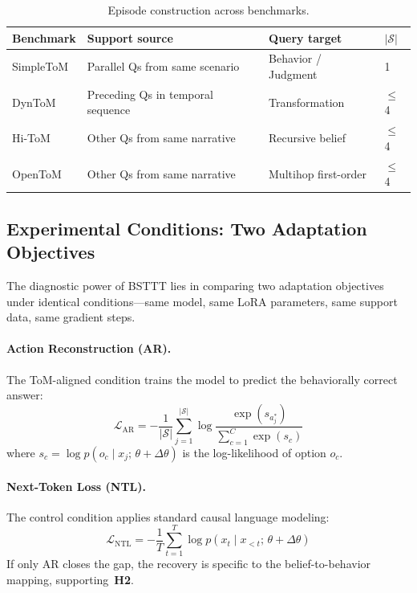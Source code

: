 \documentclass{article}
\begin{document}
\begin{table}[t]
    \caption{Episode construction across benchmarks.}
    \label{tab:episode_construction}
    \centering
    \small
    \begin{tabular}{@{}llll@{}}
        \toprule
        \textbf{Benchmark} & \textbf{Support source} & \textbf{Query target} & \textbf{$|\mathcal{S}|$} \\
        \midrule
        SimpleToM & Parallel Qs from same scenario & Behavior / Judgment & 1 \\
        DynToM    & Preceding Qs in temporal sequence & Transformation & $\leq$4 \\
        Hi-ToM    & Other Qs from same narrative & Recursive belief & $\leq$4 \\
        OpenToM   & Other Qs from same narrative & Multihop first-order & $\leq$4 \\
        \bottomrule
    \end{tabular}
\end{table}


\subsection{Experimental Conditions: Two Adaptation Objectives}
\label{sec:objectives}

The diagnostic power of BSTTT lies in comparing two adaptation objectives under identical conditions---same model, same LoRA parameters, same support data, same gradient steps.

\paragraph{Action Reconstruction (AR).}
The ToM-aligned condition trains the model to predict the behaviorally correct answer:
\begin{equation}
    \mathcal{L}_\mathrm{AR} = -\frac{1}{|\mathcal{S}|} \sum_{j=1}^{|\mathcal{S}|} \log \frac{\exp(s_{a_j^*})}{\sum_{c=1}^{C} \exp(s_c)}
    \label{eq:ar_loss}
\end{equation}
where $s_c = \log p(o_c \mid x_j;\, \theta + \Delta\theta)$ is the log-likelihood of option $o_c$.

\paragraph{Next-Token Loss (NTL).}
The control condition applies standard causal language modeling:
\begin{equation}
    \mathcal{L}_\mathrm{NTL} = -\frac{1}{T} \sum_{t=1}^{T} \log p(x_t \mid x_{<t};\, \theta + \Delta\theta)
    \label{eq:ntl_loss}
\end{equation}
If only AR closes the gap, the recovery is specific to the belief-to-behavior mapping, supporting~\textbf{H2}.
\end{document}
